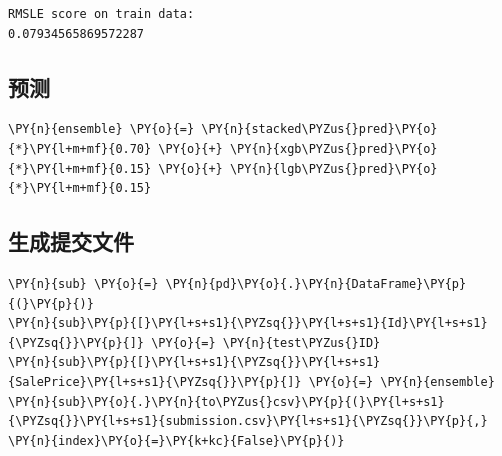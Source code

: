 \documentclass[no-math]{YangThesis}
\begin{document}
\begin{Verbatim}[commandchars=\\\{\}]
RMSLE score on train data:
0.07934565869572287
\end{Verbatim}

\hypertarget{ux9884ux6d4b}{%
	\subsection{预测}\label{ux9884ux6d4b}}

\begin{tcolorbox}[breakable, size=fbox, boxrule=1pt, pad at break*=1mm,colback=cellbackground, colframe=cellborder]
	\begin{Verbatim}[commandchars=\\\{\}]
\PY{n}{ensemble} \PY{o}{=} \PY{n}{stacked\PYZus{}pred}\PY{o}{*}\PY{l+m+mf}{0.70} \PY{o}{+} \PY{n}{xgb\PYZus{}pred}\PY{o}{*}\PY{l+m+mf}{0.15} \PY{o}{+} \PY{n}{lgb\PYZus{}pred}\PY{o}{*}\PY{l+m+mf}{0.15}
	\end{Verbatim}
\end{tcolorbox}

\hypertarget{ux751fux6210ux63d0ux4ea4ux6587ux4ef6}{%
	\subsection{生成提交文件}\label{ux751fux6210ux63d0ux4ea4ux6587ux4ef6}}

\begin{tcolorbox}[breakable, size=fbox, boxrule=1pt, pad at break*=1mm,colback=cellbackground, colframe=cellborder]
	\begin{Verbatim}[commandchars=\\\{\}]
\PY{n}{sub} \PY{o}{=} \PY{n}{pd}\PY{o}{.}\PY{n}{DataFrame}\PY{p}{(}\PY{p}{)}
\PY{n}{sub}\PY{p}{[}\PY{l+s+s1}{\PYZsq{}}\PY{l+s+s1}{Id}\PY{l+s+s1}{\PYZsq{}}\PY{p}{]} \PY{o}{=} \PY{n}{test\PYZus{}ID}
\PY{n}{sub}\PY{p}{[}\PY{l+s+s1}{\PYZsq{}}\PY{l+s+s1}{SalePrice}\PY{l+s+s1}{\PYZsq{}}\PY{p}{]} \PY{o}{=} \PY{n}{ensemble}
\PY{n}{sub}\PY{o}{.}\PY{n}{to\PYZus{}csv}\PY{p}{(}\PY{l+s+s1}{\PYZsq{}}\PY{l+s+s1}{submission.csv}\PY{l+s+s1}{\PYZsq{}}\PY{p}{,} \PY{n}{index}\PY{o}{=}\PY{k+kc}{False}\PY{p}{)}
	\end{Verbatim}
\end{tcolorbox}
\end{document}
